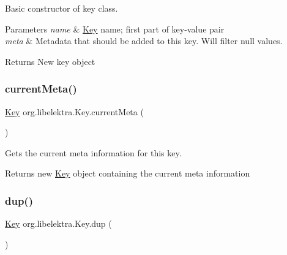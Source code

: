 Basic constructor of key class. 


\begin{DoxyParams}{Parameters}
{\em name} & \hyperlink{classorg_1_1libelektra_1_1Key}{Key} name; first part of key-\/value pair \\
\hline
{\em meta} & Metadata that should be added to this key. Will filter null values. \\
\hline
\end{DoxyParams}
\begin{DoxyReturn}{Returns}
New key object 
\end{DoxyReturn}
\mbox{\label{classorg_1_1libelektra_1_1Key_af6a740822cebbda1e500093c4d69c5f8}} 
\subsubsection{\texorpdfstring{current\+Meta()}{currentMeta()}}
{\footnotesize\ttfamily \hyperlink{classorg_1_1libelektra_1_1Key}{Key} org.\+libelektra.\+Key.\+current\+Meta (\begin{DoxyParamCaption}{ }\end{DoxyParamCaption})\hspace{0.3cm}{\ttfamily [inline]}}



Gets the current meta information for this key. 

\begin{DoxyReturn}{Returns}
new \hyperlink{classorg_1_1libelektra_1_1Key}{Key} object containing the current meta information 
\end{DoxyReturn}
\mbox{\label{classorg_1_1libelektra_1_1Key_a67a839951aa9bc48f8ffbb1ebcdfb819}} 
\subsubsection{\texorpdfstring{dup()}{dup()}\hspace{0.1cm}{\footnotesize\ttfamily [1/2]}}
{\footnotesize\ttfamily \hyperlink{classorg_1_1libelektra_1_1Key}{Key} org.\+libelektra.\+Key.\+dup (\begin{DoxyParamCaption}{ }\end{DoxyParamCaption})\hspace{0.3cm}{\ttfamily [inline]}}




